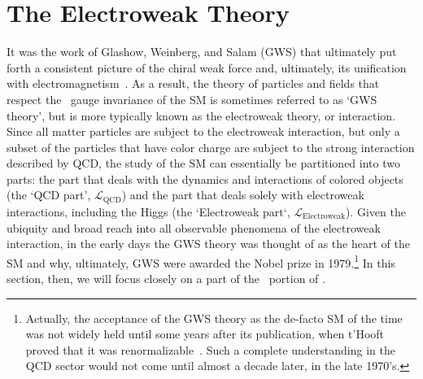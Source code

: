 \section{The Electroweak Theory}
\label{sec:ewk_description}

It was the work of Glashow, Weinberg, and Salam (GWS) that ultimately put forth a
consistent picture of the chiral weak force and, ultimately,
its unification with electromagnetism~\cite{Glashow:1961tr,Weinberg:1967tq,Salam:1968rm}.
As a result, the theory of particles and fields that respect the \SUtwoXone~gauge
invariance of the SM is sometimes referred to as `GWS theory', 
but is more typically known as the electroweak theory, or interaction. Since all matter particles
are subject to the electroweak interaction, but only a subset of the particles that
have color charge are subject to the strong interaction described by QCD, the study of the SM can essentially
be partitioned into two parts: the part that deals with the dynamics and interactions of
colored objects (the `QCD part', $\mathcal{L}_{\text{QCD}}$) and the part that deals solely with electroweak interactions, including the Higgs (the `Electroweak part`, $\mathcal{L}_{\text{Electroweak}}$).
Given the ubiquity and broad reach into all observable phenomena of the electroweak interaction,
in the early days the GWS theory was thought of as the heart of the SM and why, ultimately,
GWS were awarded the Nobel prize in 1979.\footnote{Actually, the acceptance of the GWS theory as the
de-facto SM of the time was not widely held until some years after its publication, when t'Hooft
proved that it was renormalizable~\cite{tHooft:1971akt,tHooft:1971qjg}.
Such a complete understanding in the QCD sector would not come until almost a decade later, in the late 1970's{\color{red}{Woijkec etc CITE}}.} In this section, then, we will focus closely on a part of the  \SUtwoXone~portion of \SML.

